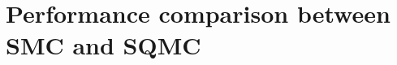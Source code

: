 

\section{Performance comparison between SMC and SQMC}
\label{sec:performance-comparison-smc-sqmc}

